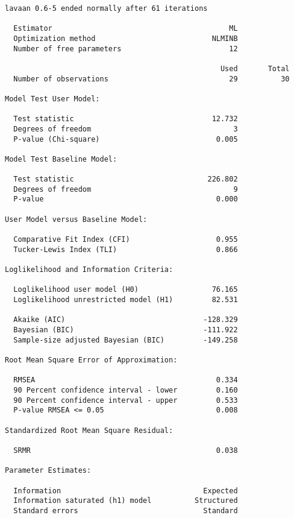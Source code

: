 \begin{verbatim}
lavaan 0.6-5 ended normally after 61 iterations

  Estimator                                         ML
  Optimization method                           NLMINB
  Number of free parameters                         12
                                                      
                                                  Used       Total
  Number of observations                            29          30
                                                                  
Model Test User Model:
                                                      
  Test statistic                                12.732
  Degrees of freedom                                 3
  P-value (Chi-square)                           0.005

Model Test Baseline Model:

  Test statistic                               226.802
  Degrees of freedom                                 9
  P-value                                        0.000

User Model versus Baseline Model:

  Comparative Fit Index (CFI)                    0.955
  Tucker-Lewis Index (TLI)                       0.866

Loglikelihood and Information Criteria:

  Loglikelihood user model (H0)                 76.165
  Loglikelihood unrestricted model (H1)         82.531
                                                      
  Akaike (AIC)                                -128.329
  Bayesian (BIC)                              -111.922
  Sample-size adjusted Bayesian (BIC)         -149.258

Root Mean Square Error of Approximation:

  RMSEA                                          0.334
  90 Percent confidence interval - lower         0.160
  90 Percent confidence interval - upper         0.533
  P-value RMSEA <= 0.05                          0.008

Standardized Root Mean Square Residual:

  SRMR                                           0.038

Parameter Estimates:

  Information                                 Expected
  Information saturated (h1) model          Structured
  Standard errors                             Standard


\end{verbatim}
